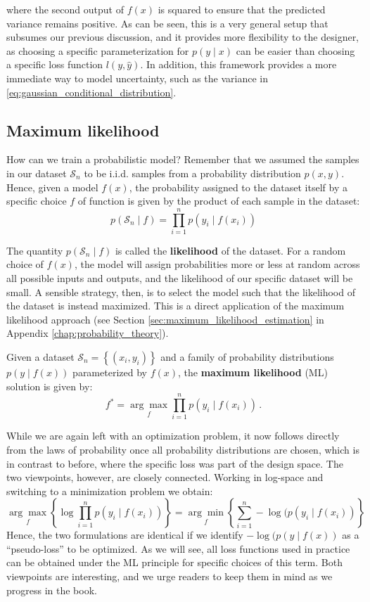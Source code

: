 \vspace{1em}
where the second output of $f(x)$ is squared to ensure that the predicted variance remains positive. As can be seen, this is a very general setup that subsumes our previous discussion, and it provides more flexibility to the designer, as choosing a specific parameterization for $p(y \;\vert\; x)$ can be easier than choosing a specific loss function $l(y, \hat{y})$. In addition, this framework provides a more immediate way to model uncertainty, such as the variance in \eqref{eq:gaussian_conditional_distribution}.
%
\subsection{Maximum likelihood}
%
How can we train a probabilistic model? Remember that we assumed the samples in our dataset $\mathcal{S}_n$ to be i.i.d. samples from a probability distribution $p(x,y)$. Hence, given a model $f(x)$, the probability assigned to the dataset itself by a specific choice $f$ of function is given by the product of each sample in the dataset:
%
$$
p(\mathcal{S}_n \;\vert\; f)=\prod_{i=1}^n p(y_i \;\vert\; f(x_i))
$$

The quantity $p(\mathcal{S}_n  \;\vert\; f)$ is called the \textbf{likelihood} of the dataset. For a random choice of $f(x)$, the model will assign probabilities more or less at random across all possible inputs and outputs, and the likelihood of our specific dataset will be small. A sensible strategy, then, is to select the model such that the likelihood of the dataset is instead maximized. This is a direct application of the maximum likelihood approach (see Section \ref{sec:maximum_likelihood_estimation} in Appendix \ref{chap:probability_theory}).

\begin{definition} \addbottle
Given a dataset $\mathcal{S}_n = \left\{(x_i, y_i)\right\}$ and a family of probability distributions $p(y \;\vert\; f(x))$ parameterized by $f(x)$, the \textbf{maximum likelihood} (ML) solution is given by:
%
$$
f^* = \underset{f}{\arg\max}\prod_{i=1}^n p(y_i \;\vert\; f(x_i)) \,.
$$
\end{definition}

While we are again left with an optimization problem, it now follows directly from the laws of probability once all probability distributions are chosen, which is in contrast to before, where the specific loss was part of the design space. The two viewpoints, however, are closely connected. Working in log-space and switching to a minimization problem we obtain:
%
$$
\underset{f}{\arg\max} \left\{ \log \prod_{i=1}^n p(y_i \;\vert\; f(x_i)) \right\} = \underset{f}{\arg\min} \left\{ \sum_{i=1}^n -\log(p(y_i \;\vert\; f(x_i)) \right\}
$$
%
Hence, the two formulations are identical if we identify $-\log(p(y \;\vert\; f(x))$ as a “pseudo-loss” to be optimized. As we will see, all loss functions used in practice can be obtained under the ML principle for specific choices of this term. Both viewpoints are interesting, and we urge readers to keep them in mind as we progress in the book.

